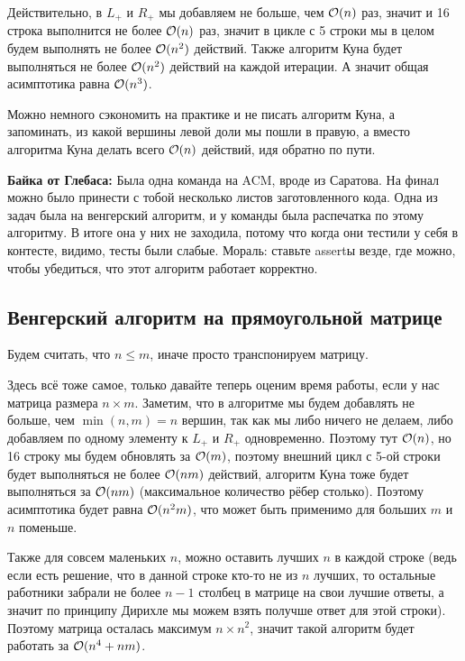 \documentclass[a4paper, 12pt]{article}
\begin{document}
Действительно, в $L_+$ и $R_+$ мы добавляем не больше, чем $\mathcal{O}(n)$ раз, значит
и 16 строка выполнится не более $\mathcal{O}(n)$ раз, значит в цикле с 5 строки мы
в целом будем выполнять не более $\mathcal{O}(n^2)$ действий. Также
алгоритм Куна будет выполняться не более $\mathcal{O}(n^2)$ действий на каждой итерации.
А значит общая асимптотика равна $\mathcal{O}(n^3)$.

Можно немного сэкономить на практике
и не писать алгоритм Куна, а запоминать, из какой
вершины левой доли мы пошли в правую, а вместо алгоритма Куна делать всего
$\mathcal{O}(n)$ действий, идя обратно по пути.

{\bf Байка от Глебаса:} Была одна команда на ACM, вроде из Саратова. На финал
можно было принести с тобой несколько листов заготовленного кода.
Одна из задач была на венгерский алгоритм, и у команды была распечатка по этому алгоритму.
В итоге она у них не заходила, потому что когда они тестили у себя в контесте,
видимо, тесты были слабые. Мораль: ставьте assertы везде, где можно, чтобы
убедиться, что этот алгоритм работает корректно.

\subsection{Венгерский алгоритм на прямоугольной матрице}

Будем считать, что $n \leqslant m$, иначе просто транспонируем матрицу.

Здесь всё тоже самое, только давайте теперь оценим время работы, если у нас
матрица размера $n \times m$. Заметим, что в алгоритме мы будем добавлять не больше,
чем $\min(n, m) = n$ вершин, так как мы либо ничего не делаем, либо добавляем по
одному элементу к $L_+$ и $R_+$ одновременно. Поэтому тут $\mathcal{O}(n)$, но 16 строку
мы будем обновлять за $\mathcal{O}(m)$, поэтому внешний цикл с 5-ой строки будет
выполняться не более $\mathcal{O}(nm)$ действий, алгоритм Куна тоже будет выполняться
за $\mathcal{O}(nm)$ (максимальное количество рёбер столько). Поэтому асимптотика будет
равна $\mathcal{O}(n^2m)$, что может быть применимо для больших $m$ и
$n$ поменьше.

Также для совсем маленьких $n$, можно оставить лучших $n$ в каждой строке (ведь
если есть решение, что в данной строке кто-то не из $n$ лучших, то остальные
работники забрали не более $n - 1$ столбец в матрице на свои лучшие ответы, а значит
по принципу Дирихле мы можем взять получше ответ для этой строки). Поэтому матрица
осталась максимум $n \times n^2$, значит такой алгоритм будет работать за $\mathcal{O}(n^4 + nm)$.
\end{document}
